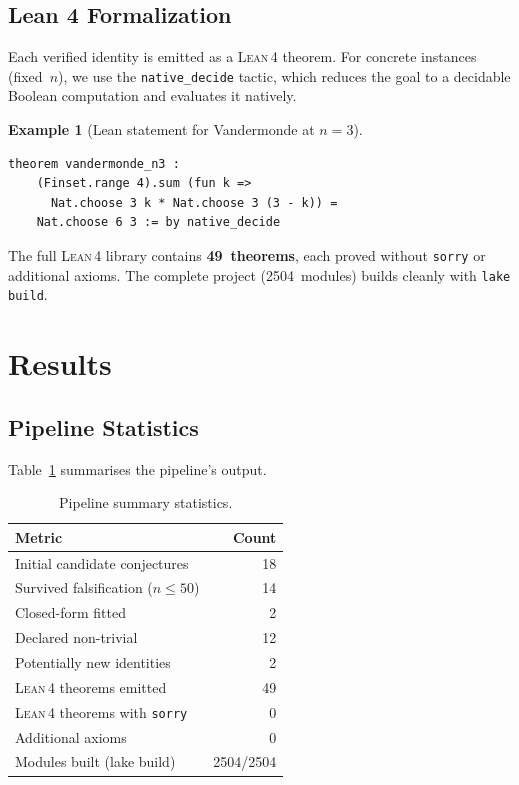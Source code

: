 \documentclass[11pt,a4paper]{article}
\theoremstyle{definition}
\newtheorem{example}[theorem]{Example}
\theoremstyle{remark}
\newcommand{\lean}{\textsc{Lean\,4}}
\newcommand{\sorry}{\texttt{sorry}}
\begin{document}
\subsection{Lean 4 Formalization}\label{sec:lean}

Each verified identity is emitted as a \lean{} theorem.
For concrete instances (fixed~$n$), we use the \texttt{native\_decide}
tactic, which reduces the goal to a decidable Boolean computation
and evaluates it natively.

\begin{example}[Lean statement for Vandermonde at $n=3$]
\begin{verbatim}
theorem vandermonde_n3 :
    (Finset.range 4).sum (fun k =>
      Nat.choose 3 k * Nat.choose 3 (3 - k)) =
    Nat.choose 6 3 := by native_decide
\end{verbatim}
\end{example}

The full \lean{} library contains \textbf{49~theorems}, each proved
without \sorry{} or additional axioms.  The complete project
(2504~modules) builds cleanly with \texttt{lake build}.


\section{Results}\label{sec:results}

\subsection{Pipeline Statistics}\label{sec:stats}

Table~\ref{tab:pipeline} summarises the pipeline's output.

\begin{table}[ht]
\centering
\caption{Pipeline summary statistics.}\label{tab:pipeline}
\begin{tabular}{@{}lr@{}}
\toprule
\textbf{Metric} & \textbf{Count} \\
\midrule
Initial candidate conjectures & 18 \\
Survived falsification ($n\le 50$) & 14 \\
Closed-form fitted & 2 \\
Declared non-trivial & 12 \\
Potentially new identities & 2 \\
\lean{} theorems emitted & 49 \\
\lean{} theorems with \sorry{} & 0 \\
Additional axioms & 0 \\
Modules built (lake build) & 2504/2504 \\
\bottomrule
\end{tabular}
\end{table}
\end{document}
